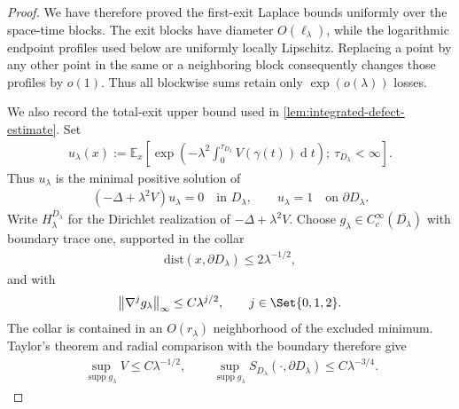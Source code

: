 \documentclass[a4paper,10pt]{article}
\numberwithin{equation}{section}
\theoremstyle{plain}
\theoremstyle{plain}
\theoremstyle{plain}
\theoremstyle{plain}
\theoremstyle{plain}
\theoremstyle{remark}
\theoremstyle{definition}
\newcommand{\EE}{\mathbb{E}}
\newcommand\norm[1]{\left\lVert#1\right\rVert}
\newcommand{\dif}{\operatorname{d}\!} %
\newcommand{\dist}{\mathrm{dist}}
\newcommand{\supp}{\operatorname{supp}}
\newcommand{\eq}[1]{\begin{align*}#1\end{align*}}
\newcommand{\eql}[1]{\begin{align}#1\end{align}}
\newcommand{\br}[1]{\left(#1\right)}
\begin{document}
\begin{proof}
We have therefore proved the first-exit Laplace bounds uniformly over
the space-time blocks. The exit blocks have diameter
$O(\ell_\lambda)$, while the logarithmic endpoint profiles used below
are uniformly locally Lipschitz. Replacing a point by any other point
in the same or a neighboring block consequently changes those
profiles by $o(1)$. Thus all blockwise sums retain only
$\exp(o(\lambda))$ losses.

We also record the total-exit upper bound used in
\cref{lem:integrated-defect-estimate}. Set
\eql{
u_\lambda(x)
:=
\EE_x\left[
\exp\left(
-\lambda^2\int_0^{\tau_{D_\lambda}}V(\gamma(t))\dif{t}
\right);
\ \tau_{D_\lambda}<\infty
\right].
\label{eq:total-exit-harmonic-function}
}
Thus $u_\lambda$ is the minimal positive solution of
\eq{
\br{-\Delta+\lambda^2V}u_\lambda=0
\quad\text{in }D_\lambda,
\qquad
u_\lambda=1
\quad\text{on }\partial D_\lambda.
}
Write $H_\lambda^{D_\lambda}$ for the Dirichlet realization of
$-\Delta+\lambda^2V$. Choose
$g_\lambda\in C_c^\infty(\overline{D_\lambda})$ with boundary trace
one, supported in the collar
\eq{
\dist\br{x,\partial D_\lambda}
\leq
2\lambda^{-1/2},
}
and with
\eq{
\norm{\nabla^j g_\lambda}_\infty
\leq
C\lambda^{j/2},
\qquad
j\in\Set{0,1,2}.
}
The collar is contained in an $O(r_\lambda)$ neighborhood of the
excluded minimum. Taylor's theorem and radial comparison with the
boundary therefore give
\eql{
\sup_{\supp g_\lambda}V
\leq
C\lambda^{-1/2},
\qquad
\sup_{\supp g_\lambda}
S_{D_\lambda}\br{\cdot,\partial D_\lambda}
\leq
C\lambda^{-3/4}.
\label{eq:total-exit-collar-bounds}
}


\end{proof}
\end{document}
